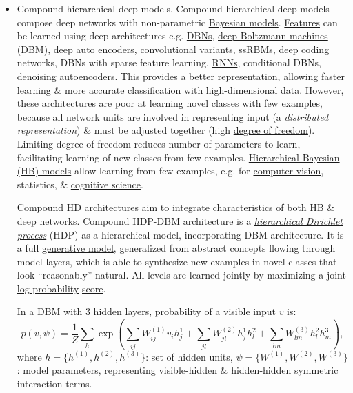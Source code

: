 \documentclass{article}
\begin{document}
\begin{itemize}
	\item {\sf Compound hierarchical-deep models.} Compound hierarchical-deep models compose deep networks with non-parametric \href{https://en.wikipedia.org/wiki/Bayesian_network}{Bayesian models}. \href{https://en.wikipedia.org/wiki/Feature_(machine_learning)}{Features} can be learned using deep architectures e.g. \href{https://en.wikipedia.org/wiki/Deep_belief_network}{DBNs}, \href{https://en.wikipedia.org/wiki/Deep_Boltzmann_machine}{deep Boltzmann machines} (DBM), deep auto encoders, convolutional variants, \href{https://en.wikipedia.org/wiki/Spike-and-slab_RBM}{ssRBMs}, deep coding networks, DBNs with sparse feature learning, \href{https://en.wikipedia.org/wiki/Recursive_neural_network}{RNNs}, conditional DBNs, \href{https://en.wikipedia.org/wiki/Denoising_autoencoder}{denoising autoencoders}. This provides a better representation, allowing faster learning \& more accurate classification with high-dimensional data. However, these architectures are poor at learning novel classes with few examples, because all network units are involved in representing input (a {\it distributed representation}) \& must be adjusted together (high \href{https://en.wikipedia.org/wiki/Degree_of_freedom}{degree of freedom}). Limiting degree of freedom reduces number of parameters to learn, facilitating learning of new classes from few examples. \href{https://en.wikipedia.org/wiki/Hierarchical_Bayesian_model}{Hierarchical Bayesian (HB) models} allow learning from few examples, e.g. for \href{https://en.wikipedia.org/wiki/Computer_vision}{computer vision}, statistics, \& \href{https://en.wikipedia.org/wiki/Cognitive_science}{cognitive science}.
	
	Compound HD architectures aim to integrate characteristics of both HB \& deep networks. Compound HDP-DBM architecture is a \href{https://en.wikipedia.org/wiki/Hierarchical_Dirichlet_process}{\it hierarchical Dirichlet process} (HDP) as a hierarchical model, incorporating DBM architecture. It is a full \href{https://en.wikipedia.org/wiki/Generative_model}{generative model}, generalized from abstract concepts flowing through model layers, which is able to synthesize new examples in novel classes that look ``reasonably'' natural. All levels are learned jointly by maximizing a joint \href{https://en.wikipedia.org/wiki/Log_probability}{log-probability} \href{https://en.wikipedia.org/wiki/Score_(statistics)}{score}.
	
	In a DBM with 3 hidden layers, probability of a visible input $v$ is:
	\begin{equation}
		p(v,\psi) = \frac{1}{Z}\sum_h \exp\left(\sum_{ij} W_{ij}^{(1)}v_ih_j^1 + \sum_{jl} W_{jl}^{(2)}h_j^1h_l^2 + \sum_{lm} W_{lm}^{(3)}h_l^2h_m^3\right),
	\end{equation}
	where $h = \{h^{(1)},h^{(2)},h^{(3)}\}$: set of hidden units, $\psi = \{W^{(1)},W^{(2)},W^{(3)}\}$: model parameters, representing visible-hidden \& hidden-hidden symmetric interaction terms.
	

\end{itemize}
\end{document}
